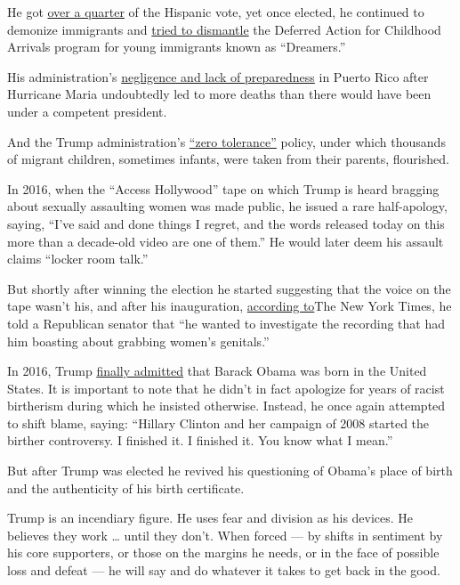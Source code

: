He got \href{https://www.cnn.com/election/2016/results/exit-polls}{over
a quarter} of the Hispanic vote, yet once elected, he continued to
demonize immigrants and
\href{https://www.foxnews.com/politics/trump-says-he-will-sign-order-to-provide-road-to-citizenship-for-dreamers}{tried
to dismantle} the Deferred Action for Childhood Arrivals program for
young immigrants known as ``Dreamers.''

His administration's
\href{https://www.nytimes.com/2018/07/12/us/fema-puerto-rico-maria.html}{negligence
and lack of preparedness} in Puerto Rico after Hurricane Maria
undoubtedly led to more deaths than there would have been under a
competent president.

And the Trump administration's
\href{https://www.splcenter.org/news/2020/06/17/family-separation-under-trump-administration-timeline}{``zero
tolerance''} policy, under which thousands of migrant children,
sometimes infants, were taken from their parents, flourished.

In 2016, when the ``Access Hollywood'' tape on which Trump is heard
bragging about sexually assaulting women was made public, he issued a
rare half-apology, saying, ``I've said and done things I regret, and the
words released today on this more than a decade-old video are one of
them.'' He would later deem his assault claims ``locker room talk.''

But shortly after winning the election he started suggesting that the
voice on the tape wasn't his, and after his inauguration,
\href{https://www.nytimes.com/2017/11/28/us/politics/trump-access-hollywood-tape.html}{according
to}The New York Times, he told a Republican senator that ``he wanted to
investigate the recording that had him boasting about grabbing women's
genitals.''

In 2016, Trump
\href{https://www.youtube.com/watch?v=fjHPDzUOe2U}{finally admitted}
that Barack Obama was born in the United States. It is important to note
that he didn't in fact apologize for years of racist birtherism during
which he insisted otherwise. Instead, he once again attempted to shift
blame, saying: ``Hillary Clinton and her campaign of 2008 started the
birther controversy. I finished it. I finished it. You know what I
mean.''

But after Trump was elected he revived his questioning of Obama's place
of birth and the authenticity of his birth certificate.

Trump is an incendiary figure. He uses fear and division as his devices.
He believes they work \ldots{} until they don't. When forced --- by
shifts in sentiment by his core supporters, or those on the margins he
needs, or in the face of possible loss and defeat --- he will say and do
whatever it takes to get back in the good.

